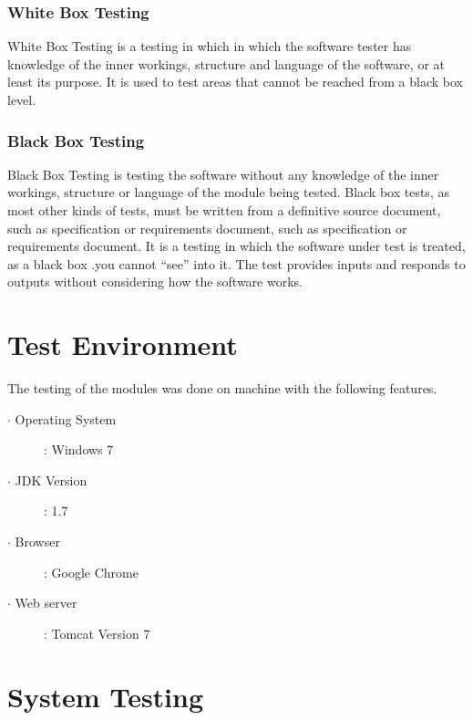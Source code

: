 \documentclass[12pt]{report}
\begin{document}
\subsubsection{White Box Testing}
White Box Testing is a testing in which in which the software tester has
knowledge of the inner workings, structure and language of the software, or at least its
purpose. It is used to test areas that cannot be reached from a black box level.
\subsubsection{Black Box Testing}
Black Box Testing is testing the software without any knowledge of the inner
workings, structure or language of the module being tested. Black box tests, as most
other kinds of tests, must be written from a definitive source document, such as
specification or requirements document, such as specification or requirements
document. It is a testing in which the software under test is treated, as a black box
.you cannot “see” into it. The test provides inputs and responds to outputs without
considering how the software works.
\section{Test Environment}
The testing of the modules was done on machine with the following features.
\begin{description}
  \item[$\cdot$ Operating System ] : Windows 7 
  \item[$\cdot$ JDK Version ] : 1.7 
  \item[$\cdot$ Browser ] : Google Chrome 
  \item[$\cdot$ Web server ]: Tomcat Version 7 
\end{description}
\newpage

\section{System Testing}
\end{document}
